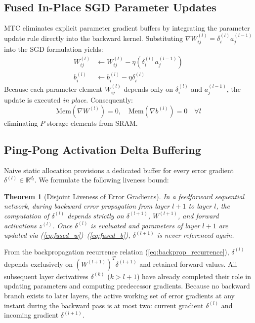 \documentclass[conference]{IEEEtran}
\newtheorem{theorem}{Theorem}
\begin{document}
\subsection{Fused In-Place SGD Parameter Updates}
MTC eliminates explicit parameter gradient buffers by integrating the parameter update rule directly into the backward kernel. Substituting $\nabla W_{ij}^{(l)} = \delta_i^{(l)} a_j^{(l-1)}$ into the SGD formulation yields:
\begin{align}
    W_{ij}^{(l)} &\leftarrow W_{ij}^{(l)} - \eta \left(\delta_i^{(l)} a_j^{(l-1)}\right) \label{eq:fused_w} \\
    b_i^{(l)} &\leftarrow b_i^{(l)} - \eta \delta_i^{(l)} \label{eq:fused_b}
\end{align}
Because each parameter element $W_{ij}^{(l)}$ depends only on $\delta_i^{(l)}$ and $a_j^{(l-1)}$, the update is executed \emph{in place}. Consequently:
\begin{equation}
    \text{Mem}\left(\nabla W^{(l)}\right) = 0, \quad \text{Mem}\left(\nabla b^{(l)}\right) = 0 \quad \forall l
\end{equation}
eliminating $P$ storage elements from SRAM.

\subsection{Ping-Pong Activation Delta Buffering}
Naive static allocation provisions a dedicated buffer for every error gradient $\delta^{(l)} \in \mathbb{R}^{d_l}$. We formulate the following liveness bound:

\begin{theorem}[Disjoint Liveness of Error Gradients]
In a feedforward sequential network, during backward error propagation from layer $l+1$ to layer $l$, the computation of $\delta^{(l)}$ depends strictly on $\delta^{(l+1)}$, $W^{(l+1)}$, and forward activations $z^{(l)}$. Once $\delta^{(l)}$ is evaluated and parameters of layer $l+1$ are updated via (\ref{eq:fused_w})--(\ref{eq:fused_b}), $\delta^{(l+1)}$ is never referenced again.
\end{theorem}

\begin{IEEEproof}
From the backpropagation recurrence relation (\ref{eq:backprop_recurrence}), $\delta^{(l)}$ depends exclusively on $(W^{(l+1)})^T \delta^{(l+1)}$ and retained forward values. All subsequent layer derivatives $\delta^{(k)}$ ($k > l+1$) have already completed their role in updating parameters and computing predecessor gradients. Because no backward branch exists to later layers, the active working set of error gradients at any instant during the backward pass is at most two: current gradient $\delta^{(l)}$ and incoming gradient $\delta^{(l+1)}$.
\end{IEEEproof}
\end{document}
